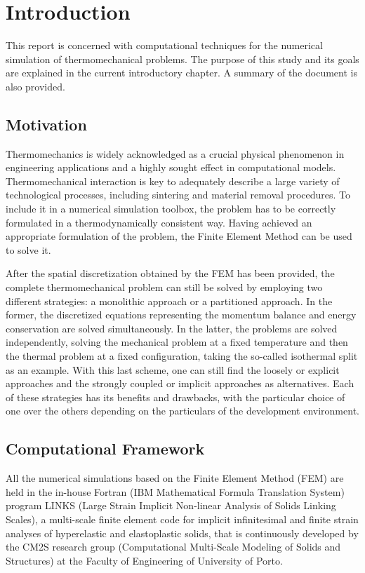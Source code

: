 \chapter{Introduction}

This report is concerned with computational techniques for the numerical simulation of thermomechanical problems.
The purpose of this study and its goals are explained in the current introductory chapter.
A summary of the document is also provided.

\section{Motivation}


Thermomechanics is widely acknowledged as a crucial physical phenomenon in engineering applications and a highly sought effect in computational models.
Thermomechanical interaction is key to adequately describe a large variety of technological processes, including sintering and material removal procedures.
To include it in a numerical simulation toolbox, the problem has to be correctly formulated in a thermodynamically consistent way.
Having achieved an appropriate formulation of the problem, the Finite Element Method can be used to solve it.

After the spatial discretization obtained by the FEM has been provided, the complete thermomechanical problem can still be solved by employing two different strategies: a monolithic approach or a partitioned approach.
In the former, the discretized equations representing the momentum balance and energy conservation are solved simultaneously.
In the latter, the problems are solved independently, solving the mechanical problem at a fixed temperature and then the thermal problem at a fixed configuration, taking the so-called isothermal split as an example.
With this last scheme, one can still find the loosely or explicit approaches and the strongly coupled or implicit approaches as alternatives.
Each of these strategies has its benefits and drawbacks, with the particular choice of one over the others depending on the particulars of the development environment.

\section{Computational Framework}

All the numerical simulations based on the Finite Element Method (FEM) are held in the in-house Fortran (IBM Mathematical Formula Translation System) program LINKS (Large Strain Implicit Non-linear Analysis of Solids Linking Scales), a multi-scale finite element code for implicit infinitesimal and finite strain analyses of hyperelastic and elastoplastic solids, that is continuously developed by the CM2S research group (Computational Multi-Scale Modeling of Solids and Structures) at the Faculty of Engineering of University of Porto.

